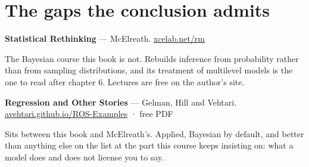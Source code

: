 \documentclass[
  letterpaper,
  10pt,
  twoside,
  openright,
  numbers=noenddot,
  chapterprefix=true]{scrbook}
\begin{document}
\section{The gaps the conclusion
admits}\label{the-gaps-the-conclusion-admits}

\textbf{Statistical Rethinking} --- McElreath.
\href{https://xcelab.net/rm/}{xcelab.net/rm}

The Bayesian course this book is not. Rebuilds inference from
probability rather than from sampling distributions, and its treatment
of multilevel models is the one to read after chapter 6. Lectures are
free on the author's site.

\textbf{Regression and Other Stories} --- Gelman, Hill and Vehtari.
\href{https://avehtari.github.io/ROS-Examples/}{avehtari.github.io/ROS-Examples}
· free PDF

Sits between this book and McElreath's. Applied, Bayesian by default,
and better than anything else on the list at the part this course keeps
insisting on: what a model does and does not license you to say.
\end{document}
